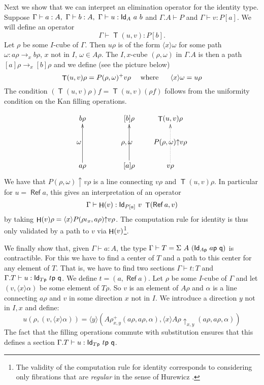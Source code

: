 \documentclass[a4paper,USenglish,draft]{lipics}
\DeclareMathOperator{\Ref}{\mathsf{Ref}}
\DeclareMathOperator{\Transp}{\mathsf{T}}
\DeclareMathOperator{\HH}{{\sf H}}
\newcommand{\Id}{{\sf Id}}
\newcommand{\pp}{{\sf p}}
\newcommand{\qq}{{\sf q}}
\newcommand{\rup}[1]{#1{\uparrow}}
\newcommand{\rupxy}[1]{#1{\uparrow_{x,y}}}
\newcommand{\bind}[2]{{\langle}#1{\rangle}#2}
\begin{document}
Next we show that we can interpret an elimination operator for the
identity type.  Suppose $\Gamma\vdash a:A,~\Gamma\vdash
b:A,~\Gamma\vdash u:\Id_A~a~b$ and $\Gamma.A\vdash P$ and
$\Gamma\vdash v:P[a]$. We will define an operator
$$
\Gamma\vdash \Transp(u,v):P[b].
$$
Let $\rho$ be some $I$-cube of $\Gamma$. Then $u\rho$ is of the form
$\bind{x}{\omega}$ for some path $\omega:a\rho\to _x b\rho$, $x$ not
in $I$, $\omega\in A\rho$.  The $I,x$-cube $(\rho ,\omega)$ in
$\Gamma.A$ is then a path $[a]\rho\to _x [b]\rho$ and we define (see
the picture below)
$$
\Transp(u,v)\rho = P(\rho ,\omega)^+ v\rho~~~~{\rm
  where~~~~~}\bind{x}{\omega} = u\rho
$$
The condition $(\Transp(u,v)\rho)f = \Transp(u,v)(\rho f)$ follows
from the uniformity condition on the Kan filling operations.

\[
\xymatrix@R=.6cm@C=.6cm{
b\rho                 &&[b]\rho                    &   \Transp(u,v)\rho                                 \\
\omega ~~~     &&\rho,\omega~~  &\rup{P(\rho,\omega)} v\rho \\
a\rho\ar[uu]      &&[a]\rho\ar[uu]       &   v\rho\ar@{.>}[uu]                        \\
}
\]
We have that $\rup{P(\rho,\omega)} v\rho$ is a line connecting
$v\rho$ and $\Transp(u,v)\rho$.  In particular for $u=\Ref a$, this gives
an interpretation of an operator
$$
\Gamma\vdash \HH(v):\Id_{P[a]}~v~\Transp(\Ref a,v)
$$
by taking $\HH(v)\rho = \bind{x}{\rup{P(\rho \iota_x,a\rho)} v\rho}$.  The
computation rule for identity is thus only validated by a path to $v$
via $\HH(v)$\footnote{The validity of the computation rule for
  identity corresponds to considering only fibrations that are {\em
    regular} in the sense of Hurewicz \cite{hurewicz}.}.


We finally show that, given $\Gamma\vdash a:A$, the type $\Gamma
\vdash T = \Sigma~A~(\Id_{A\pp}~a\pp~\qq)$ is contractible. For this
we have to find a center of $T$ and a path to this center for any
element of $T$.  That is, we have to find two sections $\Gamma\vdash
t:T$ and $\Gamma.T\vdash u:\Id_{T\pp}~t\pp~\qq$.  We define $t =
(a,\Ref a)$. Let $\rho$ be some $I$-cube of $\Gamma$ and let
$(v,\bind{x}{\alpha})$ be some element of $T\rho$. So $v$ is an
element of $A\rho$ and $\alpha$ is a line connecting $a\rho$ and $v$
in some direction $x$ not in $I$. We introduce a direction $y$ not in
$I,x$ and define:
$$
u(\rho,(v,\bind{x}{\alpha})) = \bind{y}{(A\rho^+ _{x,y}
  (a\rho,a\rho,\alpha),\bind{x}{\rupxy{A\rho}
    (a\rho,a\rho,\alpha)})}
$$
The fact that the filling operations commute with substitution ensures
that this defines a section $\Gamma.T\vdash u:\Id_{T\pp}~t\pp~\qq$.
\end{document}
